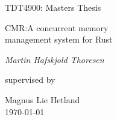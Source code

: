 \documentclass[b5paper, twoside, openright]{extreport}
\theoremstyle{plain}
\theoremstyle{definition}
\begin{document}
\renewcommand{\thepage}{\roman{page}}%

\begin{titlepage}
  \centering
  \null%
  \vspace{1cm}
  {\Large TDT4900: Masters Thesis \par}
  \vspace{2cm}
  {\huge CMR:\@ A concurrent memory\\ management system for Rust\par}
  \vspace{3cm}
  {\Large\itshape{}Martin Hafskjold Thoresen\par}
  \vfill
  supervised by\par
  {\large Magnus Lie Hetland}\\
  \vspace{2cm}
  {\large \today\\}
\end{titlepage}

\null\clearpage



\setcounter{page}{1}

\null\clearpage


\null\clearpage


\tableofcontents%


\clearpage\null%
\clearpage\setcounter{page}{1}%
\renewcommand{\thepage}{\arabic{page}}%


\pagestyle{fancy}























\end{document}
